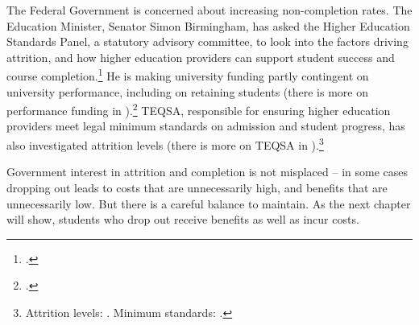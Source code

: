 The Federal Government is concerned about increasing non-completion rates. The Education Minister, Senator Simon Birmingham, has asked the Higher Education Standards Panel, a statutory advisory committee, to look into the factors driving attrition, and how higher education providers can support student success and course completion.\footcite[][5]{HigherEducationStandardsPanel2017} 
He is making university funding partly contingent on university performance, including on retaining students (there is more on performance funding in ).\footcite{AustralianGovernment2017c} 
TEQSA, responsible for ensuring higher education providers meet legal minimum standards on admission and student progress, has also investigated attrition levels (there is more on TEQSA in ).\footnote{Attrition levels: \textcite[][]{TEQSA2017e}. Minimum standards: \textcite[][]{DepartmentforEducationandTraining2015}.}

Government interest in attrition and completion is not misplaced -- in some cases dropping out leads to costs that are unnecessarily high, and benefits that are unnecessarily low. But there is a careful balance to maintain. As the next chapter will show, students who drop out receive benefits as well as incur costs.

